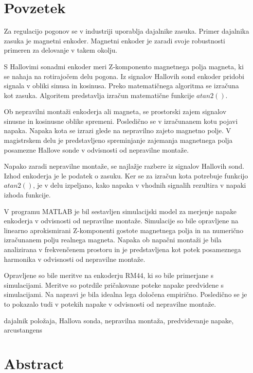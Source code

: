 \documentclass[a4paper,twoside,openright,12pt]{book}
\begin{document}
\chapter*{Povzetek}


Za regulacijo pogonov se v industriji uporablja dajalnike zasuka.
Primer dajalnika zasuka je magnetni enkoder.
Magnetni enkoder je zaradi svoje robustnosti primeren za delovanje v takem okolju.

S Hallovimi sonadmi enkoder meri Z-komponento magnetnega polja magneta, ki se nahaja na rotirajočem delu pogona.
Iz signalov Hallovih sond enkoder pridobi signala v obliki sinusa in kosinusa. Preko matematičnega algoritma se izračuna kot zasuka.
Algoritem predstavlja izračun matematične funkcije $atan2()$.

Ob nepravilni montaži enkoderja ali magneta, se prostorski zajem signalov sinusne in kosinusne oblike spremeni. Posledično se v izračunanem kotu pojavi napaka.
Napaka kota se izrazi glede na nepravilno zajeto magnetno polje. V magistrskem delu je predstavljeno spreminjanje zajemanja magnetnega polja posamezne Hallove sonde v odvisnosti od nepravilne montaže.

Napako zaradi nepravilne montaže, se najlažje razbere iz signalov Hallovih sond. Izhod enkoderja je le podatek o zasuku.
Ker se za izračun kota potrebuje funkcijo $atan2()$, je v delu izpeljano, kako napaka v vhodnih signalih rezultira v napaki izhoda funkcije.

V programu MATLAB je bil sestavljen simulacijski model za merjenje napake enkoderja v odvisnosti od nepravilne montaže.
Simulacije so bile opravljene na linearno aprokismirani Z-komponenti gostote magnetnega polja in na numerično izračunanem polju realnega magneta.
Napaka ob napačni montaži je bila analizirana v frekvenčenem prostoru in je predstavljena kot potek posameznega harmonika v odvisnosti od nepravilne montaže.

Opravljene so bile meritve na enkoderju RM44, ki so bile primerjane s simulacijami. Meritve so potrdile pričakovane poteke napake predvidene s simulacijami. Na napravi je bila idealna lega določena empirično. Posledično se je to pokazalo tudi v potekih napake v odvisnosti od nepravilne montaže.

\kljucnebesede  dajalnik položaja, Hallova sonda, nepravilna montaža, predvidevanje napake, arcustangens
\chapter*{Abstract}
\end{document}
